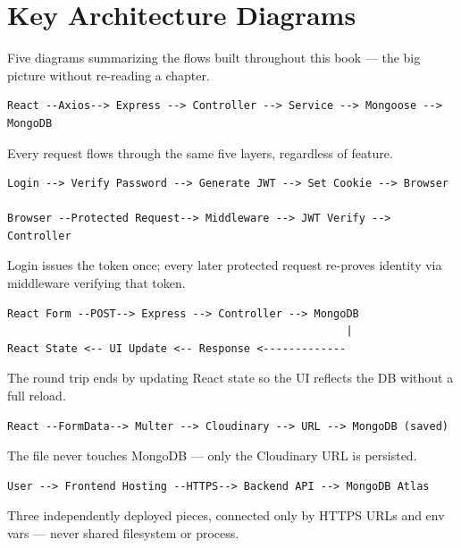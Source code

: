 \chapter{Key Architecture Diagrams}

\begin{notebox}[NOTE]
Five diagrams summarizing the flows built throughout this book --- the big picture without re-reading a chapter.
\end{notebox}

\begin{diagrambox}
\begin{verbatim}
React --Axios--> Express --> Controller --> Service --> Mongoose --> MongoDB
\end{verbatim}
\end{diagrambox}
Every request flows through the same five layers, regardless of feature.

\begin{diagrambox}
\begin{verbatim}
Login --> Verify Password --> Generate JWT --> Set Cookie --> Browser

Browser --Protected Request--> Middleware --> JWT Verify --> Controller
\end{verbatim}
\end{diagrambox}
Login issues the token once; every later protected request re-proves identity via middleware verifying that token.

\begin{diagrambox}
\begin{verbatim}
React Form --POST--> Express --> Controller --> MongoDB
                                                     |
React State <-- UI Update <-- Response <-------------
\end{verbatim}
\end{diagrambox}
The round trip ends by updating React state so the UI reflects the DB without a full reload.

\begin{diagrambox}
\begin{verbatim}
React --FormData--> Multer --> Cloudinary --> URL --> MongoDB (saved)
\end{verbatim}
\end{diagrambox}
The file never touches MongoDB --- only the Cloudinary URL is persisted.

\begin{diagrambox}
\begin{verbatim}
User --> Frontend Hosting --HTTPS--> Backend API --> MongoDB Atlas
\end{verbatim}
\end{diagrambox}
Three independently deployed pieces, connected only by HTTPS URLs and env vars --- never shared filesystem or process.
